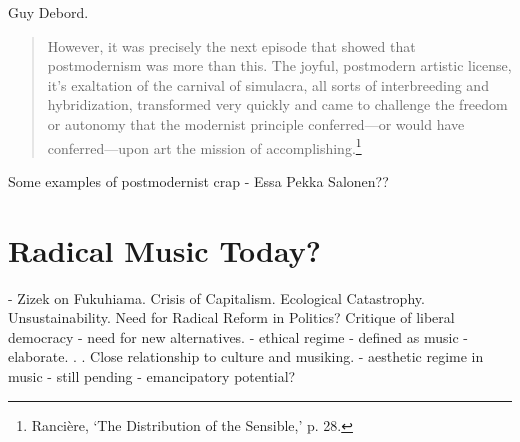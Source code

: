 Guy Debord.

\begin{quote}
However, it was precisely the next episode that showed that postmodernism was more than this. The joyful, postmodern artistic license, it's exaltation of the carnival of simulacra, all sorts of interbreeding and hybridization, transformed very quickly and came to challenge the freedom or autonomy that the modernist principle conferred---or would have conferred---upon art the mission of accomplishing.\footnote{Ranci\`{e}re, `The Distribution of the Sensible,' p. 28.}
\end{quote}

Some examples of postmodernist crap - Essa Pekka Salonen??

\section{Radical Music Today?}

- Zizek on Fukuhiama. Crisis of Capitalism. Ecological Catastrophy. Unsustainability. Need for Radical Reform in Politics? Critique of liberal democracy - need for new alternatives.
- ethical regime - defined as music - elaborate. . . Close relationship to culture and musiking.
- aesthetic regime in music - still pending - emancipatory potential?


\label{ch:introduction}